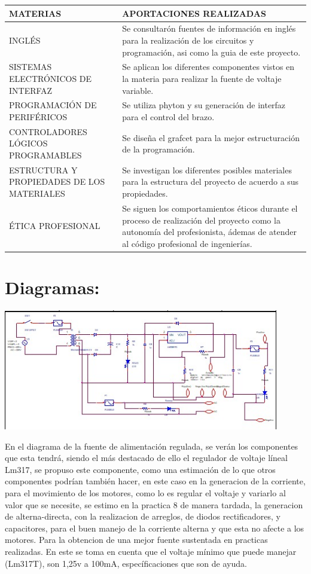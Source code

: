 \documentclass[14pt,a4paper]{article}
\begin{document}
\begin{tabular}{|p{70mm}|p{70mm}|} 

\hline
	MATERIAS & APORTACIONES REALIZADAS\\
\hline
	INGLÉS & Se consultarón fuentes de información en inglés para la realización de los circuitos y programación, asi como la guia de este proyecto.\\
\hline
	SISTEMAS ELECTRÓNICOS DE INTERFAZ & Se aplican los diferentes componentes vistos en la materia para realizar la fuente de voltaje variable.\\
\hline
	PROGRAMACIÓN DE PERIFÉRICOS & Se utiliza phyton y su generación de interfaz para el control del brazo.\\
\hline
	CONTROLADORES LÓGICOS PROGRAMABLES & Se diseña el grafcet para la mejor estructuración de la programación.\\
\hline
	ESTRUCTURA Y PROPIEDADES DE LOS MATERIALES & Se investigan los diferentes posibles materiales para la estructura del proyecto de acuerdo a sus propiedades.  \\
\hline
	ÉTICA PROFESIONAL & Se siguen los comportamientos éticos durante el proceso de realización del proyecto como la autonomía del profesionista, ádemas de atender al código profesional de ingenierías.  \\
\hline
\end{tabular}


\section{Diagramas:}

\begin{center}
\includegraphics[width=12cm]{Fuente.jpeg} 
\end{center}

En el diagrama de la fuente de alimentación regulada, se verán los componentes que esta tendrá, siendo el más destacado de ello el regulador de voltaje líneal Lm317, se propuso este componente, como una estimación de lo que otros componentes podrían también hacer, en este caso en la generacion de la corriente, para el movimiento de los motores, como lo es regular el voltaje y variarlo al valor que se necesite, se estimo en la practica 8 de manera tardada, la generacion de alterna-directa, con la realizacion de arreglos, de diodos rectificadores, y capacitores, para el buen manejo de la corriente alterna y que esta no afecte a los motores. Para la obtencion de una mejor fuente sustentada en practicas realizadas. En este se toma en cuenta que el voltaje mínimo que puede manejar (Lm317T), son 1,25v a 100mA, específicaciones que son de ayuda.\\
\end{document}
